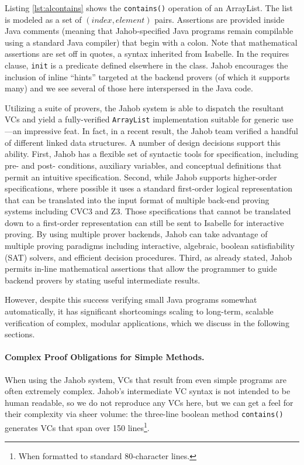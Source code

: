 Listing \ref{lst:alcontains} shows the \texttt{contains()} operation of an ArrayList.  The list is modeled as a set of $(index, element)$ pairs.  Assertions are provided inside Java comments (meaning that Jahob-specified Java programs remain compilable using a standard Java compiler) that begin with a colon.  Note that mathematical assertions are set off in quotes, a syntax inherited from Isabelle.  In the requires clause, \texttt{init} is a predicate defined elsewhere in the class.  Jahob encourages the inclusion of inline ``hints'' targeted at the backend provers\cite{zeeIntegratedProofLanguage} (of which it supports many) and we see several of those here interspersed in the Java code.



Utilizing a suite of provers, the Jahob system is able to dispatch the resultant VCs and yield a fully-verified \texttt{ArrayList} implementation suitable for generic use---an impressive feat.  In fact, in a recent result, the Jahob team verified a handful of different linked data structures\cite{zee:annotations}.  A number of design decisions support this ability.  First, Jahob has a flexible set of syntactic tools for specification, including pre- and post- conditions, auxiliary variables\cite{kingVerifier}, and conceptual definitions that permit an intuitive specification.  Second, while Jahob supports higher-order specifications, where possible it uses a standard first-order logical representation that can be translated into the input format of multiple back-end proving systems including CVC3\cite{barretCVC3} and Z3\cite{deMouraZ3}.  Those specifications that cannot be translated down to a first-order representation can still be sent to Isabelle for interactive proving.  By using multiple prover backends, Jahob can take advantage of multiple proving paradigms including interactive, algebraic, boolean satisfiability (SAT) solvers, and efficient decision procedures.  Third, as already stated, Jahob permits in-line mathematical assertions that allow the programmer to guide backend provers by stating useful intermediate results.

However, despite this success verifying small Java programs somewhat automatically, it has significant shortcomings scaling to long-term, scalable verification of complex, modular applications, which we discuss in the following sections.


\paragraph{Complex Proof Obligations for Simple Methods.\label{sec:jahobComplexVCs}}
When using the Jahob system, VCs that result from even simple programs are often extremely complex. Jahob's intermediate VC syntax is not intended to be human readable, so we do not reproduce any VCs here, but we can get a feel for their complexity via sheer volume: the three-line boolean method \texttt{contains()} generates VCs that span over 150 lines\footnote{When formatted to standard 80-character lines.}.  

